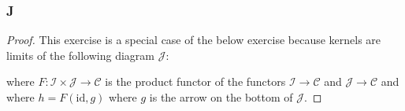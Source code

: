 \documentclass{article}
\newcommand{\id}{\mathrm{id}}
\newcommand{\fI}{\mathscr{I}}
\newcommand{\fJ}{\mathscr{J}}
\newcommand{\fC}{\mathscr{C}}
\begin{document}
\subsubsection{J}\label{1.6.J}
\begin{proof}
    This exercise is a special case of the below exercise because kernels are limits of the following diagram $\fJ$:
    \begin{center}
    \end{center}
where $F:\fI\times \fJ\to \fC$ is the product functor of the functors $\fI \to \fC$ and $\fJ\to \fC$ and where $h=F(\id, g)$ where $g$ is the arrow on the bottom of $\fJ$.
\end{proof}
\end{document}
